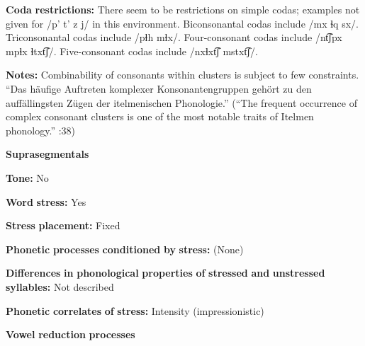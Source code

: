 \begin{styleBody}
\textbf{Coda} \textbf{restrictions:} There seem to be restrictions on simple codas; examples not given for /p’ t’ z j/ in this environment. Biconsonantal codas include /mx ɬq sx/. Triconsonantal codas include /pɬh mɬx/. Four-consonant codas include /nt͡ʃpx mpɬx ɬtxt͡ʃ/. Five-consonant codas include /nxɬxt͡ʃ mstxt͡ʃ/.
\end{styleBody}

\begin{styleBody}
\textbf{Notes:} Combinability of consonants within clusters is subject to few constraints. “Das häufige Auftreten komplexer Konsonantengruppen gehört zu den auffällingsten Zügen der itelmenischen Phonologie.” (“The frequent occurrence of complex consonant clusters is one of the most notable traits of Itelmen phonology.” \citealt{GeorgVolodin1999}:38)
\end{styleBody}

\begin{styleBody}
\textbf{Suprasegmentals}
\end{styleBody}

\begin{styleBody}
\textbf{Tone:} No
\end{styleBody}

\begin{styleBody}
\textbf{Word} \textbf{stress:} Yes
\end{styleBody}

\begin{styleBody}
\textbf{Stress} \textbf{placement:} Fixed
\end{styleBody}

\begin{styleBody}
\textbf{Phonetic} \textbf{processes} \textbf{conditioned} \textbf{by} \textbf{stress:} (None)
\end{styleBody}

\begin{styleBody}
\textbf{Differences} \textbf{in} \textbf{phonological} \textbf{properties} \textbf{of} \textbf{stressed} \textbf{and} \textbf{unstressed} \textbf{syllables:} Not described
\end{styleBody}

\begin{styleBody}
\textbf{Phonetic} \textbf{correlates} \textbf{of} \textbf{stress:} Intensity (impressionistic)
\end{styleBody}

\begin{styleBody}
\textbf{Vowel} \textbf{reduction} \textbf{processes}
\end{styleBody}

